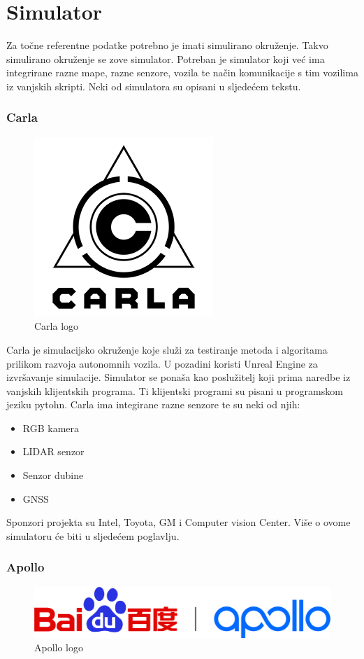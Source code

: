 \section{Simulator}

Za točne referentne podatke potrebno je imati simulirano okruženje. Takvo simulirano okruženje se zove simulator. Potreban je simulator koji već ima integrirane razne mape, razne senzore, vozila te način komunikacije s tim vozilima iz vanjskih skripti. Neki od simulatora su opisani u sljedećem tekstu.

\subsubsection{Carla}
\begin{figure}[ht!]
  \centering
  \includegraphics[scale=0.5]{images/carla_logo.png}
  \caption{Carla logo}
\end{figure}

Carla je simulacijsko okruženje koje služi za testiranje metoda i algoritama prilikom razvoja autonomnih vozila. U pozadini koristi Unreal Engine za izvršavanje simulacije. Simulator se ponaša kao poslužitelj koji prima naredbe iz vanjskih klijentskih programa. Ti klijentski programi su pisani u programskom jeziku pytohn.
Carla ima integirane razne senzore te su neki od njih:
\begin{itemize}
  \item RGB kamera
  \item LIDAR senzor
  \item Senzor dubine
  \item GNSS
\end{itemize}

Sponzori projekta su Intel, Toyota, GM i Computer vision Center. Više o ovome simulatoru će biti u sljedećem poglavlju.

\subsubsection{Apollo}
\begin{figure}[ht!]
  \centering
  \includegraphics[scale=0.2]{images/apollo_logo.png}
  \caption{Apollo logo}
\end{figure}


